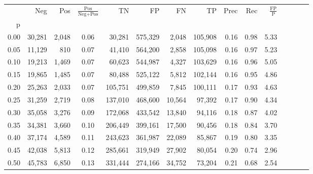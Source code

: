 \begin{tabular}{rrrcrrrrrrrrrrr}
\toprule
{} &     Neg &    Pos & $\frac{\text{Pos}}{\text{Neg}+\text{Pos}}$ &       TN &       FP &       FN &       TP &  Prec &   Rec & $\frac{\text{FP}}{\text{P}}$ \\
p    &         &        &                                            &          &          &          &          &       &       &                              \\
\midrule
0.00 &  30,281 &  2,048 &                                       0.06 &   30,281 &  575,329 &    2,048 &  105,908 &  0.16 &  0.98 &                         5.33 \\
0.05 &  11,129 &    810 &                                       0.07 &   41,410 &  564,200 &    2,858 &  105,098 &  0.16 &  0.97 &                         5.23 \\
0.10 &  19,213 &  1,469 &                                       0.07 &   60,623 &  544,987 &    4,327 &  103,629 &  0.16 &  0.96 &                         5.05 \\
0.15 &  19,865 &  1,485 &                                       0.07 &   80,488 &  525,122 &    5,812 &  102,144 &  0.16 &  0.95 &                         4.86 \\
0.20 &  25,263 &  2,033 &                                       0.07 &  105,751 &  499,859 &    7,845 &  100,111 &  0.17 &  0.93 &                         4.63 \\
0.25 &  31,259 &  2,719 &                                       0.08 &  137,010 &  468,600 &   10,564 &   97,392 &  0.17 &  0.90 &                         4.34 \\
0.30 &  35,058 &  3,276 &                                       0.09 &  172,068 &  433,542 &   13,840 &   94,116 &  0.18 &  0.87 &                         4.02 \\
0.35 &  34,381 &  3,660 &                                       0.10 &  206,449 &  399,161 &   17,500 &   90,456 &  0.18 &  0.84 &                         3.70 \\
0.40 &  37,174 &  4,589 &                                       0.11 &  243,623 &  361,987 &   22,089 &   85,867 &  0.19 &  0.80 &                         3.35 \\
0.45 &  42,038 &  5,813 &                                       0.12 &  285,661 &  319,949 &   27,902 &   80,054 &  0.20 &  0.74 &                         2.96 \\
0.50 &  45,783 &  6,850 &                                       0.13 &  331,444 &  274,166 &   34,752 &   73,204 &  0.21 &  0.68 &                         2.54 \\

\end{tabular}
